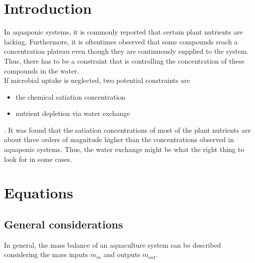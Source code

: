 \documentclass{scrartcl}
\begin{document}
\tableofcontents




\section{Introduction}
In aquaponic systems, it is commonly reported that certain plant nutrients are lacking. Furthermore, it is oftentimes observed that some compounds reach a concentration plateau even though they are continuously supplied to the system. Thus, there has to be a constraint that is controlling the concentration of these compounds in the water.\\
If microbial uptake is neglected, two potential constraints are
\begin{itemize}
	\item the chemical satiation concentration
	\item nutrient depletion via water exchange
\end{itemize}
. It was found that the satiation concentrations of most of the plant nutrients are about three orders of magnitude higher than the concentrations observed in aquaponic systems. Thus, the water exchange might be what the right thing to look for in some cases.






\section{Equations}


\subsection{General considerations}
In general, the mass balance of an aquaculture system can be described considering the mass inputs $m_{in}$ and outputs $m_{out}$.
\end{document}
